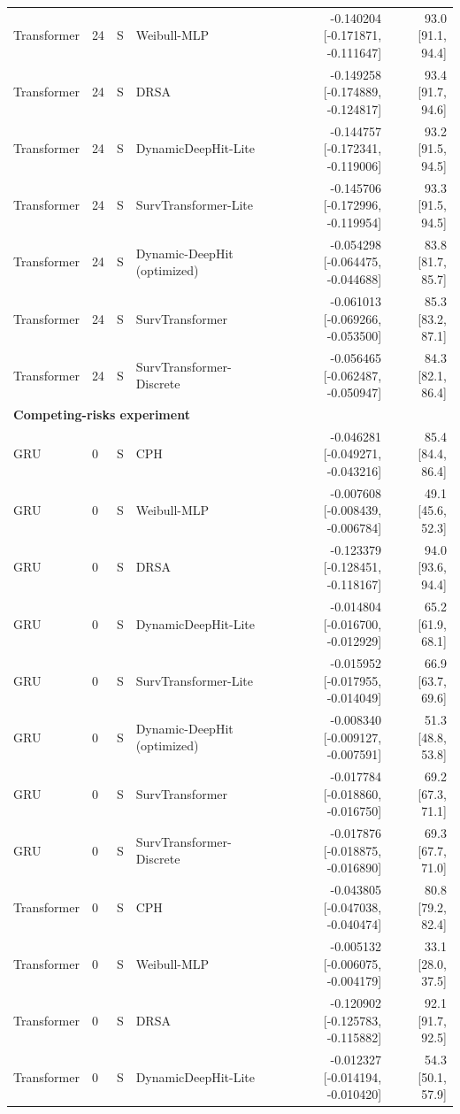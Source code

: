 \begin{longtable}{lll p{3.0cm} rr}
Transformer & 24 & S & Weibull-MLP & -0.140204 [-0.171871, -0.111647] & 93.0 [91.1, 94.4]\\
Transformer & 24 & S & DRSA & -0.149258 [-0.174889, -0.124817] & 93.4 [91.7, 94.6]\\
Transformer & 24 & S & DynamicDeepHit-Lite & -0.144757 [-0.172341, -0.119006] & 93.2 [91.5, 94.5]\\
Transformer & 24 & S & SurvTransformer-Lite & -0.145706 [-0.172996, -0.119954] & 93.3 [91.5, 94.5]\\
Transformer & 24 & S & Dynamic-DeepHit (optimized) & -0.054298 [-0.064475, -0.044688] & 83.8 [81.7, 85.7]\\
Transformer & 24 & S & SurvTransformer & -0.061013 [-0.069266, -0.053500] & 85.3 [83.2, 87.1]\\
Transformer & 24 & S & SurvTransformer-Discrete & -0.056465 [-0.062487, -0.050947] & 84.3 [82.1, 86.4]\\
\multicolumn{6}{l}{\textbf{Competing-risks experiment}}\\\midrule
GRU & 0 & S & CPH & -0.046281 [-0.049271, -0.043216] & 85.4 [84.4, 86.4]\\
GRU & 0 & S & Weibull-MLP & -0.007608 [-0.008439, -0.006784] & 49.1 [45.6, 52.3]\\
GRU & 0 & S & DRSA & -0.123379 [-0.128451, -0.118167] & 94.0 [93.6, 94.4]\\
GRU & 0 & S & DynamicDeepHit-Lite & -0.014804 [-0.016700, -0.012929] & 65.2 [61.9, 68.1]\\
GRU & 0 & S & SurvTransformer-Lite & -0.015952 [-0.017955, -0.014049] & 66.9 [63.7, 69.6]\\
GRU & 0 & S & Dynamic-DeepHit (optimized) & -0.008340 [-0.009127, -0.007591] & 51.3 [48.8, 53.8]\\
GRU & 0 & S & SurvTransformer & -0.017784 [-0.018860, -0.016750] & 69.2 [67.3, 71.1]\\
GRU & 0 & S & SurvTransformer-Discrete & -0.017876 [-0.018875, -0.016890] & 69.3 [67.7, 71.0]\\
Transformer & 0 & S & CPH & -0.043805 [-0.047038, -0.040474] & 80.8 [79.2, 82.4]\\
Transformer & 0 & S & Weibull-MLP & -0.005132 [-0.006075, -0.004179] & 33.1 [28.0, 37.5]\\
Transformer & 0 & S & DRSA & -0.120902 [-0.125783, -0.115882] & 92.1 [91.7, 92.5]\\
Transformer & 0 & S & DynamicDeepHit-Lite & -0.012327 [-0.014194, -0.010420] & 54.3 [50.1, 57.9]\\

\end{longtable}

